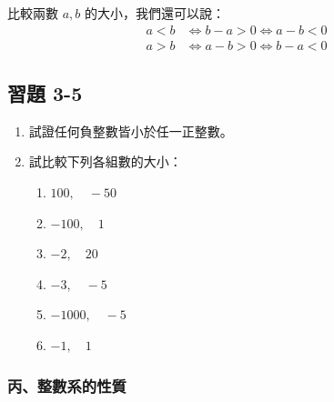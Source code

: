 比較兩數 $a, b$ 的大小，我們還可以說：
\begin{align*}
  a < b &\iff b - a > 0 \iff a - b < 0 \\
  a > b &\iff a - b > 0 \iff b - a < 0
\end{align*}

\subsection*{習題 3-5}\label{sec:ex3-5}

\begin{enumerate}[1., leftmargin=2em]
  \item 試證任何負整數皆小於任一正整數。
  \item 試比較下列各組數的大小：
  \begin{enumerate}[(1)]
    \item $100, \quad -50$
    \item $-100, \quad 1$
    \item $-2, \quad 20$
    \item $-3, \quad -5$
    \item $-1000, \quad -5$
    \item $-1, \quad 1$
  \end{enumerate}
\end{enumerate}

\subsubsection*{丙、整數系的性質}\label{subsec:int_properties}

